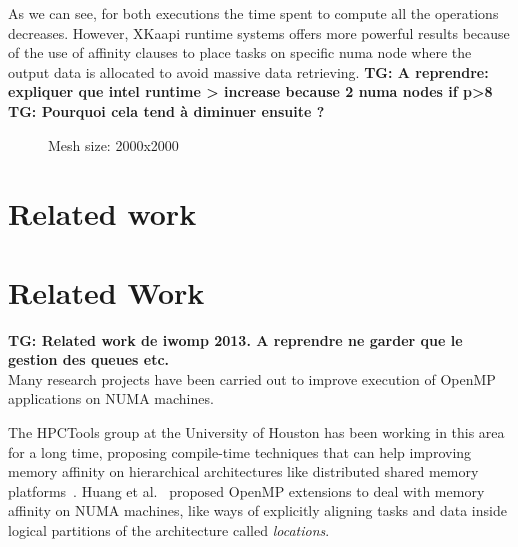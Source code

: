 \documentclass{Styles/llncs}
\newcommand{\TG}[1]{{\color{red}\bfseries TG: #1}}
\begin{document}
As we can see, for both executions the time spent to compute all the operations decreases. However, XKaapi runtime systems offers more powerful results because of the use of affinity clauses to place tasks on specific numa node where the output data is allocated to avoid massive data retrieving.
\TG{A reprendre: expliquer que intel runtime > increase because 2 numa nodes if p>8}
\TG{Pourquoi cela tend à diminuer ensuite ?}

\begin{figure}
  \centering
    \caption{Mesh size: 2000x2000}
    \label{figs:spmv:2000}
\end{figure}



\section{Related work}

\section{Related Work}
\label{sec:related_work}

\TG{Related work de iwomp 2013. A reprendre ne garder que le gestion des queues etc.}\\

Many research projects have been carried out to improve execution of
OpenMP applications on NUMA machines.

The HPCTools group at the University of Houston has been working in
this area for a long time, proposing compile-time techniques that can
help improving memory affinity on hierarchical architectures like
distributed shared memory
platforms~\cite{Marowka:2004:OAD:1064428.1064431}. Huang et
al.~\cite{Huang-Chapman-locality-OpenMP} proposed OpenMP extensions to
deal with memory affinity on NUMA machines, like ways of explicitly
aligning tasks and data inside logical partitions of the architecture
called \textit{locations}.
\end{document}
